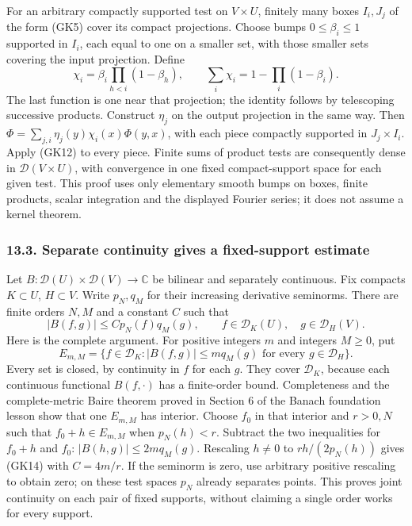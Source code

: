 \documentclass[
  11pt,
]{article}
\begin{document}
For an arbitrary compactly supported test on \(V\times U\), finitely
many boxes \(I_i,J_j\) of the form (GK5) cover its compact projections.
Choose bumps \(0\leq\beta_i\leq1\) supported in \(I_i\), each equal to
one on a smaller set, with those smaller sets covering the input
projection. Define \[
 \chi_i=\beta_i\prod_{h<i}(1-\beta_h),\qquad
 \sum_i\chi_i=1-\prod_i(1-\beta_i).
 \tag{GK13}
\] The last function is one near that projection; the identity follows
by telescoping successive products. Construct \(\eta_j\) on the output
projection in the same way. Then
\(\Phi=\sum_{j,i}\eta_j(y)\chi_i(x)\Phi(y,x)\), with each piece
compactly supported in \(J_j\times I_i\). Apply (GK12) to every piece.
Finite sums of product tests are consequently dense in
\(\mathcal D(V\times U)\), with convergence in one fixed compact-support
space for each given test. This proof uses only elementary smooth bumps
on boxes, finite products, scalar integration and the displayed Fourier
series; it does not assume a kernel theorem.

\subsubsection{13.3. Separate continuity gives a fixed-support
estimate}\label{separate-continuity-gives-a-fixed-support-estimate}

Let \(B:\mathcal D(U)\times\mathcal D(V)\to\mathbb C\) be bilinear and
separately continuous. Fix compacts \(K\subset U\), \(H\subset V\).
Write \(p_N,q_M\) for their increasing derivative seminorms. There are
finite orders \(N,M\) and a constant \(C\) such that \[
 |B(f,g)|\leq C p_N(f)q_M(g),
 \qquad f\in\mathcal D_K(U),\quad g\in\mathcal D_H(V).
 \tag{GK14}
\] Here is the complete argument. For positive integers \(m\) and
integers \(M\geq0\), put \[
 E_{m,M}=\{f\in\mathcal D_K:|B(f,g)|\leq m q_M(g)
                                      \text{ for every }g\in\mathcal D_H\}.
 \tag{GK15}
\] Every set is closed, by continuity in \(f\) for each \(g\). They
cover \(\mathcal D_K\), because each continuous functional
\(B(f,\cdot)\) has a finite-order bound. Completeness and the
complete-metric Baire theorem proved in Section 6 of the Banach
foundation lesson show that one \(E_{m,M}\) has interior. Choose \(f_0\)
in that interior and \(r>0,N\) such that \(f_0+h\in E_{m,M}\) when
\(p_N(h)<r\). Subtract the two inequalities for \(f_0+h\) and \(f_0\):
\(|B(h,g)|\leq2m q_M(g)\). Rescaling \(h\ne0\) to \(r h/(2p_N(h))\)
gives (GK14) with \(C=4m/r\). If the seminorm is zero, use arbitrary
positive rescaling to obtain zero; on these test spaces \(p_N\) already
separates points. This proves joint continuity on each pair of fixed
supports, without claiming a single order works for every support.
\end{document}
